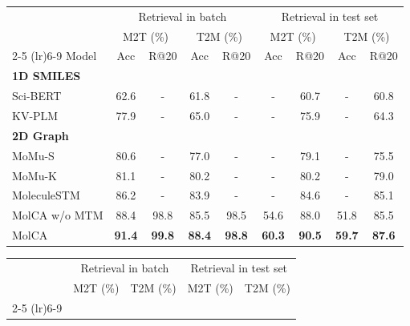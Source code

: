 \documentclass[11pt]{article}
\begin{document}
\begin{table*}[t!]
\begin{subtable}[t]{\textwidth}
   \centering
   \small
   \begin{tabular}{lcccccccc}\toprule
    & \multicolumn{4}{c}{Retrieval in batch} & \multicolumn{4}{c}{Retrieval in test set} \\
    & \multicolumn{2}{c}{M2T (\%)} & \multicolumn{2}{c}{T2M (\%)} & \multicolumn{2}{c}{M2T (\%)} & \multicolumn{2}{c}{T2M (\%)} \\\cmidrule(lr){2-5} \cmidrule(lr){6-9}
   Model & Acc & \multicolumn{1}{c}{R@20} & Acc & \multicolumn{1}{c}{R@20} & \multicolumn{1}{c}{Acc} & R@20 & \multicolumn{1}{c}{Acc} & R@20 \\\midrule
   \multicolumn{2}{l}{\textbf{1D SMILES}} & & \multicolumn{1}{l}{} & & & \multicolumn{1}{l}{} & & \multicolumn{1}{l}{} \\
   Sci-BERT & 62.6 & - & 61.8 & - & - & 60.7 & - & 60.8 \\
   KV-PLM & 77.9 & - & 65.0 & - & - & 75.9 & - & 64.3 \\\midrule
   \multicolumn{2}{l}{\textbf{2D Graph}} & & \multicolumn{1}{l}{} & & & \multicolumn{1}{l}{} & & \multicolumn{1}{l}{} \\
   MoMu-S & 80.6 & - & 77.0 & - & - & 79.1 & - & 75.5 \\
   MoMu-K & 81.1 & - & 80.2 & - & - & 80.2 & - & 79.0 \\
   MoleculeSTM & 86.2 & - & 83.9 & - & - & 84.6 & - & 85.1 \\
   MolCA w/o MTM & 88.4 & \multicolumn{1}{c}{98.8} & 85.5 & \multicolumn{1}{c}{98.5} & \multicolumn{1}{c}{54.6} & 88.0 & \multicolumn{1}{c}{51.8} & 85.5 \\
   MolCA & \textbf{91.4} & \multicolumn{1}{c}{\textbf{99.8}} & \textbf{88.4} & \multicolumn{1}{c}{\textbf{98.8}} & \multicolumn{1}{c}{\textbf{60.3}} & \textbf{90.5} & \multicolumn{1}{c}{\textbf{59.7}} & \textbf{87.6} \\\bottomrule
   \end{tabular}
   \caption{Molecule-text retrieval performances in the PCDes dataset.}
   \end{subtable}
   \begin{subtable}[t]{\textwidth}
   \small
   \centering
   \begin{tabular}{lcccccccc} \toprule
    & \multicolumn{4}{c}{Retrieval in batch} & \multicolumn{4}{c}{Retrieval in test set} \\
    & \multicolumn{2}{c}{M2T (\%)} & \multicolumn{2}{c}{T2M (\%)} & \multicolumn{2}{c}{M2T (\%)} & \multicolumn{2}{c}{T2M (\%)} \\\cmidrule(lr){2-5} \cmidrule(lr){6-9}

\end{tabular}
\end{subtable}
\end{table*}
\end{document}
